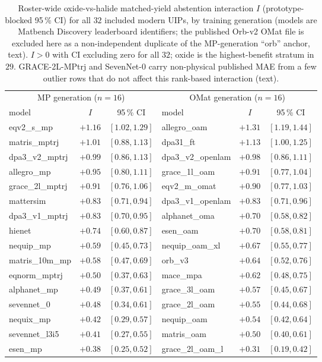 \documentclass[aip,jcp,preprint,superscriptaddress,amsmath,amssymb]{revtex4-2}
\begin{document}
\begin{table}[t]
  \centering
  \small
  \caption{Roster-wide oxide-vs-halide matched-yield abstention interaction $I$ (prototype-blocked
  95\,\% CI) for all $32$ included modern UIPs, by training generation (models are Matbench
  Discovery leaderboard identifiers; the published Orb-v2
  OMat file is excluded here as a non-independent duplicate of the MP-generation ``orb'' anchor,
  text). $I>0$ with CI excluding zero for all $32$; oxide is the highest-benefit stratum in $29$.
  GRACE-2L-MPtrj and SevenNet-0 carry non-physical published MAE from a few outlier rows that do
  not affect this rank-based interaction (text).}
  \label{tab:roster}
  \begin{tabular}{lcc@{\hskip 1.4em}lcc}
    \toprule
    \multicolumn{3}{c}{MP generation ($n=16$)} & \multicolumn{3}{c}{OMat generation ($n=16$)} \\
    \cmidrule(lr){1-3}\cmidrule(lr){4-6}
    model & $I$ & 95\,\% CI & model & $I$ & 95\,\% CI \\
    \midrule
    eqv2\_s\_mp & $+1.16$ & $[1.02,1.29]$ & allegro\_oam & $+1.31$ & $[1.19,1.44]$ \\
    matris\_mptrj & $+1.01$ & $[0.88,1.13]$ & dpa31\_ft & $+1.13$ & $[1.00,1.25]$ \\
    dpa3\_v2\_mptrj & $+0.99$ & $[0.86,1.13]$ & dpa3\_v2\_openlam & $+0.98$ & $[0.86,1.11]$ \\
    allegro\_mp & $+0.95$ & $[0.80,1.11]$ & grace\_1l\_oam & $+0.91$ & $[0.77,1.04]$ \\
    grace\_2l\_mptrj & $+0.91$ & $[0.76,1.06]$ & eqv2\_m\_omat & $+0.90$ & $[0.77,1.03]$ \\
    mattersim & $+0.83$ & $[0.71,0.94]$ & dpa3\_v1\_openlam & $+0.83$ & $[0.71,0.96]$ \\
    dpa3\_v1\_mptrj & $+0.83$ & $[0.70,0.95]$ & alphanet\_oma & $+0.70$ & $[0.58,0.82]$ \\
    hienet & $+0.74$ & $[0.60,0.87]$ & esen\_oam & $+0.70$ & $[0.58,0.81]$ \\
    nequip\_mp & $+0.59$ & $[0.45,0.73]$ & nequip\_oam\_xl & $+0.67$ & $[0.55,0.77]$ \\
    matris\_10m\_mp & $+0.58$ & $[0.47,0.69]$ & orb\_v3 & $+0.64$ & $[0.52,0.76]$ \\
    eqnorm\_mptrj & $+0.50$ & $[0.37,0.63]$ & mace\_mpa & $+0.62$ & $[0.48,0.75]$ \\
    alphanet\_mp & $+0.49$ & $[0.37,0.61]$ & grace\_3l\_oam & $+0.57$ & $[0.45,0.67]$ \\
    sevennet\_0 & $+0.48$ & $[0.34,0.61]$ & grace\_2l\_oam & $+0.55$ & $[0.44,0.68]$ \\
    nequix\_mp & $+0.42$ & $[0.29,0.57]$ & nequip\_oam & $+0.54$ & $[0.42,0.64]$ \\
    sevennet\_l3i5 & $+0.41$ & $[0.27,0.55]$ & matris\_oam & $+0.50$ & $[0.40,0.61]$ \\
    esen\_mp & $+0.38$ & $[0.25,0.52]$ & grace\_2l\_oam\_l & $+0.31$ & $[0.19,0.42]$ \\
    \bottomrule
  \end{tabular}
\end{table}
\end{document}
